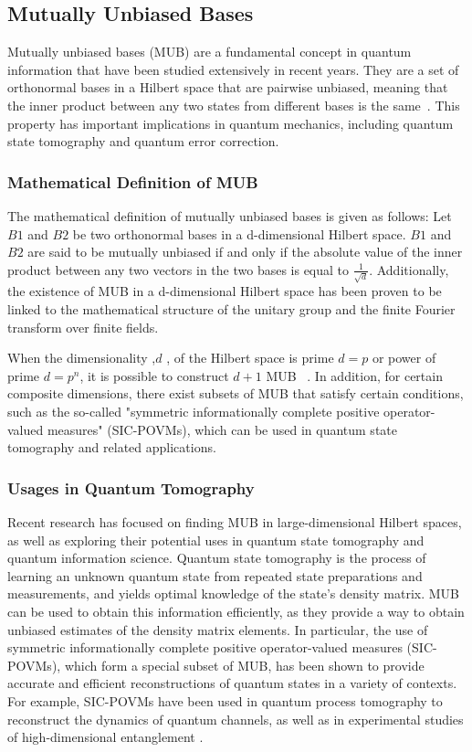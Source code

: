 \usepackage{latex}\subsection{Mutually Unbiased Bases}\label{subsec:mutually-unbiased-bases}
Mutually unbiased bases (MUB) are a fundamental concept in quantum information that have been studied extensively in recent years.
They are a set of orthonormal bases in a Hilbert space that are pairwise unbiased, meaning that the inner product between
any two states from different bases is the same~\cite{durt2010mutually}.
This property has important implications in quantum mechanics,
including quantum state tomography and quantum error correction.

\subsubsection{Mathematical Definition of MUB}\label{subsubsec:mathematical-definition-of-mub}
The mathematical definition of mutually unbiased bases is given as follows:
Let $B1$ and $B2$ be two orthonormal bases in a d-dimensional Hilbert space.
$B1$ and $B2$ are said to be mutually unbiased
if and only if the absolute value of the inner product between any two vectors in the two bases is equal to $\frac{1}{\sqrt {d}}$.
Additionally, the existence of MUB in a d-dimensional Hilbert space has been proven to be linked to the
mathematical structure of the unitary group and the finite Fourier transform over finite fields.

When the dimensionality ,$d$ , of the Hilbert space is prime $d=p$ or power of prime $d=p^n$, it is possible to construct $d+1$ MUB ~\cite{durt2010mutually}.
In addition, for certain composite dimensions, there exist subsets of MUB that satisfy certain conditions,
such as the so-called "symmetric informationally complete positive operator-valued measures" (SIC-POVMs),
which can be used in quantum state tomography and related applications.


\subsubsection{Usages in Quantum Tomography}
Recent research has focused on finding MUB in large-dimensional Hilbert spaces, as well as exploring their potential
uses in quantum state tomography and quantum information science.
Quantum state tomography is the process of learning an unknown quantum state from repeated state preparations and measurements,
and yields optimal knowledge of the state's density matrix.
MUB can be used to obtain this information efficiently,
as they provide a way to obtain unbiased estimates of the density matrix elements. In particular, the use of symmetric
informationally complete positive operator-valued measures (SIC-POVMs), which form a special subset of MUB,
has been shown to provide accurate and efficient reconstructions of quantum states in a variety of contexts.
For example, SIC-POVMs have been used in quantum process tomography to reconstruct the dynamics of quantum channels,
as well as in experimental studies of high-dimensional entanglement \cite{ZhuHayashi2020}\cite{GrossEtAl2010}.


